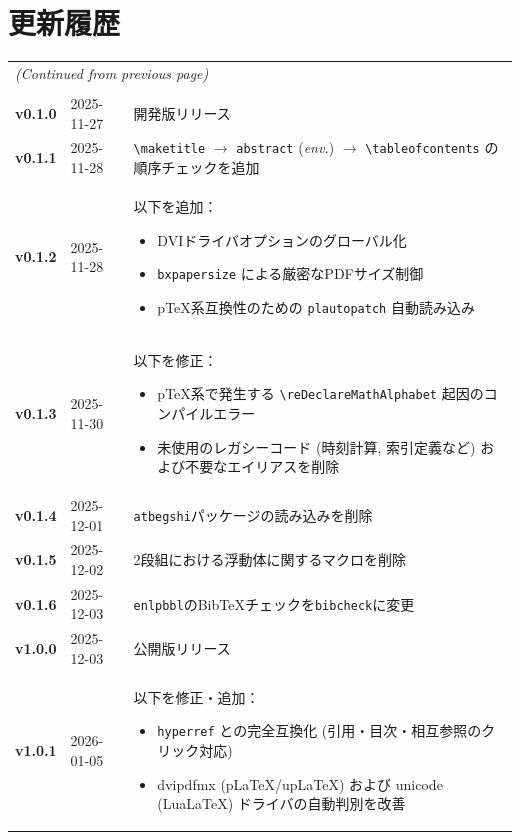 \documentclass{ltjsarticle}
\newcommand{\pkg}[1]{\texttt{#1}}
\newcommand{\cs}[1]{\texttt{\textbackslash#1}}
\begin{document}
\section{更新履歴}
\begin{longtable}{llp{11cm}}
    \endfirsthead
    \multicolumn{3}{l}{\small \textit{(Continued from previous page)}} \\
    \noalign{\smallskip}
    \endhead
    \noalign{\smallskip}
    \multicolumn{3}{r}{\small \textit{(Continued on next page)}} \\
    \endfoot
    \endlastfoot
    \textbf{v0.1.0}&2025-11-27&開発版リリース\\
    \textbf{v0.1.1}&2025-11-28&\cs{maketitle} $\to$ \texttt{abstract} (\textit{env.}) $\to$ \cs{tableofcontents} の順序チェックを追加\\
    \textbf{v0.1.2}&2025-11-28&以下を追加：
    \begin{itemize}[nosep]
        \item DVIドライバオプションのグローバル化
        \item \pkg{bxpapersize} による厳密なPDFサイズ制御
        \item pTeX系互換性のための \pkg{plautopatch} 自動読み込み
    \end{itemize}\\
    \textbf{v0.1.3}&2025-11-30&以下を修正：
    \begin{itemize}[nosep]
        \item pTeX系で発生する \cs{reDeclareMathAlphabet} 起因のコンパイルエラー
        \item 未使用のレガシーコード (時刻計算, 索引定義など) および不要なエイリアスを削除
    \end{itemize}\\
    \textbf{v0.1.4}&2025-12-01&\pkg{atbegshi}パッケージの読み込みを削除\\
    \textbf{v0.1.5}&2025-12-02&2段組における浮動体に関するマクロを削除\\
    \textbf{v0.1.6}&2025-12-03&\pkg{enlpbbl}のBibTeXチェックを\pkg{bibcheck}に変更\\
    \textbf{v1.0.0}&2025-12-03&公開版リリース\\
    \textbf{v1.0.1}&2026-01-05&以下を修正・追加：
    \begin{itemize}[nosep]
        \item \pkg{hyperref} との完全互換化 (引用・目次・相互参照のクリック対応)
        \item dvipdfmx (pLaTeX/upLaTeX) および unicode (LuaLaTeX) ドライバの自動判別を改善

\end{itemize}
\end{longtable}
\end{document}
